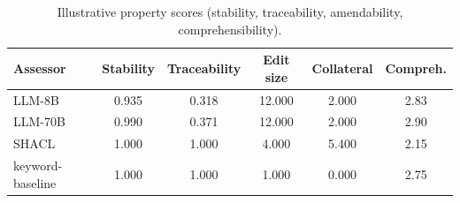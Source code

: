 \begin{table}[htbp]
\centering
\caption{Illustrative property scores (stability, traceability, amendability, comprehensibility).}
\label{tab:property_scores}
\begin{tabular}{lccccc}
\toprule
Assessor & Stability & Traceability & Edit size & Collateral & Compreh. \\
\midrule
LLM-8B & 0.935 & 0.318 & 12.000 & 2.000 & 2.83 \\
LLM-70B & 0.990 & 0.371 & 12.000 & 2.000 & 2.90 \\
SHACL & 1.000 & 1.000 & 4.000 & 5.400 & 2.15 \\
keyword-baseline & 1.000 & 1.000 & 1.000 & 0.000 & 2.75 \\
\bottomrule
\end{tabular}
\end{table}

